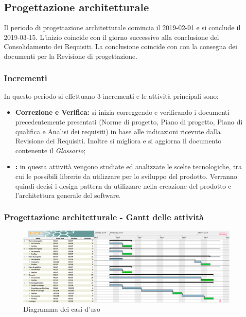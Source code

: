 \subsection{Progettazione architetturale}
Il periodo di progettazione architetturale comincia il 2019-02-01 e si conclude il 2019-03-15. L'inizio coincide con il giorno successivo alla conclusione del Consolidamento dei Requisiti. La conclusione coincide con con la consegna dei documenti per la Revisione di progettazione. \\
\subsubsection{Incrementi}
In questo periodo si effettuano 3 incrementi e le attività principali sono:
\begin{itemize}
	\item \textbf{Correzione e Verifica:} si inizia correggendo e verificando i documenti precedentemente presentati (Norme di progetto, Piano di progetto, Piano di qualifica e Analisi dei requisiti) in base alle indicazioni ricevute dalla Revisione dei Requisiti. Inoltre si migliora e si aggiorna il documento contenente il \textit{Glossario};
	\item \textbf{:} in questa attività vengono studiate ed analizzate le scelte tecnologiche, tra cui le possibili librerie da utilizzare per lo sviluppo del prodotto. Verranno quindi decisi i design pattern da utilizzare nella creazione del prodotto e l'architettura generale del software.
\end{itemize}

\subsubsection{Progettazione architetturale - Gantt delle attività}

\begin{figure} [H]
	\centering
	\includegraphics[scale=0.3]{Res/Gantt/Progettazione}
	\caption{Diagramma dei casi d'uso}\label{}
\end{figure}

\pagebreak
